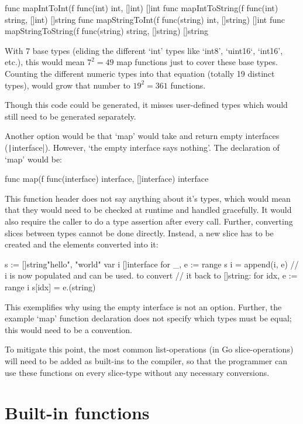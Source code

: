 \begin{gocode}
func mapIntToInt(f func(int) int, []int) []int
func mapIntToString(f func(int) string, []int) []string
func mapStringToInt(f func(string) int, []string) []int
func mapStringToString(f func(string) string, []string) []string
\end{gocode}

With 7 base types (eliding the different `int' types like `int8', `uint16`, `int16', etc.), this would
mean $7^{2} = 49$ map functions just to cover these base types. Counting the different numeric
types into that equation (totally 19 distinct types\autocite{go-basetypes}), would grow that number to $19^{2} = 361$ functions.

Though this code could be generated, it misses user-defined types which would still
need to be generated separately.

Another option would be that `map' would take and return empty interfaces
(\texttt|interface{}|). However, `the empty interface says
nothing'\autocite{empty-interface}. The declaration of `map' would be:
\begin{gocode}
	func map(f func(interface{}) interface{}, []interface{}) interface{}
\end{gocode}

This function header does not say anything about it's types, which would
mean that they would need to be checked at runtime and handled gracefully. It
would also require the caller to do a type assertion after every call. Further,
converting slices between types cannot be done directly. Instead, a
new slice has to be created and the elements converted into it:
\begin{gocode}
s := []string{"hello", "world"}
var i []interface{}
for _, e := range s {
	i = append(i, e)
}
// i is now populated and can be used. to convert
// it back to []string:
for idx, e := range i {
	s[idx] = e.(string)
}
\end{gocode}

This exemplifies why using the empty interface is not an option. Further, the
example `map' function declaration does not specify which types must be
equal; this would need to be a convention.

To mitigate this point, the most common list-operations (in Go slice-operations) will
need to be added as built-ins to the compiler, so that the programmer can use these functions
on every slice-type without any necessary conversions.

\section{Built-in functions}

